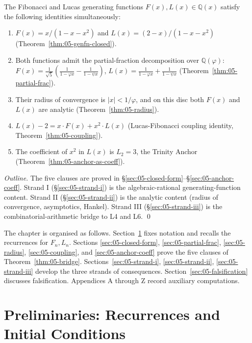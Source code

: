 \begin{theorem}
\label{thm:05-bridge}
The Fibonacci and Lucas generating functions $F(x), L(x) \in \mathbb{Q}(x)$
satisfy the following identities simultaneously:
\begin{enumerate}
  \item $F(x) = x / (1 - x - x^2)$ and $L(x) = (2 - x)/(1 - x - x^2)$
        (Theorem~\ref{thm:05-genfn-closed}).
  \item Both functions admit the partial-fraction decomposition over
        $\mathbb{Q}(\varphi)$:
        $F(x) = \frac{1}{\sqrt{5}}\left(\frac{1}{1 - \varphi x} - \frac{1}{1 - \psi x}\right)$,
        $L(x) = \frac{1}{1 - \varphi x} + \frac{1}{1 - \psi x}$
        (Theorem~\ref{thm:05-partial-frac}).
  \item Their radius of convergence is $|x| < 1/\varphi$, and on this
        disc both $F(x)$ and $L(x)$ are analytic
        (Theorem~\ref{thm:05-radius}).
  \item $L(x) - 2 = x \cdot F(x) + x^2 \cdot L(x)$ (Lucas-Fibonacci coupling
        identity, Theorem~\ref{thm:05-coupling}).
  \item The coefficient of $x^2$ in $L(x)$ is $L_2 = 3$, the Trinity Anchor
        (Theorem~\ref{thm:05-anchor-as-coeff}).
\end{enumerate}
\end{theorem}

\begin{proof}[Outline]
The five clauses are proved in §\ref{sec:05-closed-form}–§\ref{sec:05-anchor-coeff}.
Strand I (§\ref{sec:05-strand-i}) is the algebraic-rational generating-function
content. Strand II (§\ref{sec:05-strand-ii}) is the analytic content
(radius of convergence, asymptotics, Hankel). Strand III (§\ref{sec:05-strand-iii})
is the combinatorial-arithmetic bridge to L4 and L6. \qed
\end{proof}

The chapter is organised as follows. Section~\ref{sec:05-prelim}
fixes notation and recalls the recurrences for $F_n, L_n$. Sections
\ref{sec:05-closed-form}, \ref{sec:05-partial-frac}, \ref{sec:05-radius},
\ref{sec:05-coupling}, and \ref{sec:05-anchor-coeff} prove the five
clauses of Theorem~\ref{thm:05-bridge}. Sections~\ref{sec:05-strand-i},
\ref{sec:05-strand-ii}, \ref{sec:05-strand-iii} develop the three
strands of consequences. Section~\ref{sec:05-falsification} discusses
falsification. Appendices A through Z record auxiliary computations.

\section{Preliminaries: Recurrences and Initial Conditions}
\label{sec:05-prelim}


